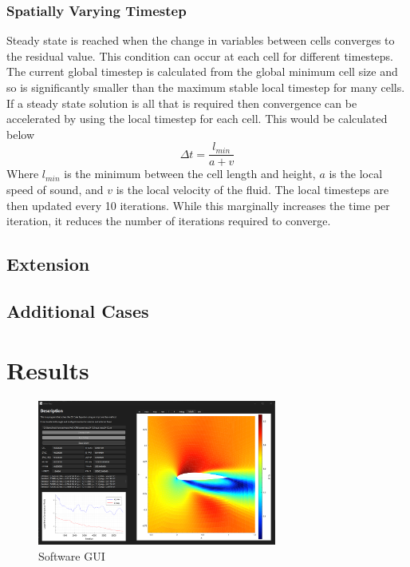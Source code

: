 \documentclass{article}
\begin{document}
\subsubsection{Spatially Varying Timestep}

Steady state is reached when the change in variables between cells converges to the residual value.
This condition can occur at each cell for different timesteps.
The current global timestep is calculated from the global minimum cell size and so is significantly smaller than the maximum stable local timestep for many cells.
If a steady state solution is all that is required then convergence can be accelerated by using the local timestep for each cell.
This would be calculated below
\begin{equation}
    \Delta t = \frac{l_{min}}{a + v}
\end{equation}
Where $l_{min}$ is the minimum between the cell length and height, $a$ is the local speed of sound, and $v$ is the local velocity of the fluid.
The local timesteps are then updated every 10 iterations.
While this marginally increases the time per iteration, it reduces the number of iterations required to converge.


\subsection{Extension}


\subsection{Additional Cases}


\section{Results}

\begin{figure}[H]
    \centering
    \includegraphics[width=0.7\textwidth]{figures/software.png}
    \caption{Software GUI}
    \label{fig:software}
\end{figure}
\end{document}
